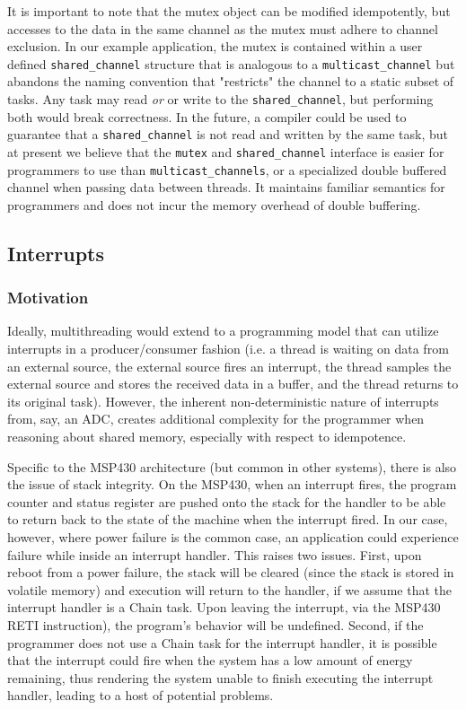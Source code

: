 \documentclass[11pt]{sensys-proc}
\newcommand{\chain}{Chain\xspace}
\begin{document}
It is important to note that the mutex object can be modified idempotently, but
accesses to the data in the same channel as the mutex must adhere to channel
exclusion. In our example application, the mutex is contained within a user
defined \texttt{shared\_channel} structure that is analogous to a
\texttt{multicast\_channel} but abandons the naming convention that "restricts"
the channel to a static subset of tasks. Any task may read {\em or} or write to
the \texttt{shared\_channel}, but performing both would break correctness. In
the future, a compiler could be used to guarantee that a
\texttt{shared\_channel} is not read and written by the same task, but at
present we believe that the \texttt{mutex} and \texttt{shared\_channel}
interface is easier for programmers to use than \texttt{multicast\_channels}, or
a specialized double buffered channel when passing data between threads. It
maintains familiar semantics for programmers and does not incur the memory
overhead of double buffering.


\subsection{Interrupts}
\subsubsection{Motivation}
Ideally, multithreading would extend to a programming model that can utilize
interrupts in a producer/consumer fashion (i.e. a thread is waiting on data
from an external source, the external source fires an interrupt, the thread
samples the external source and stores the received data in a buffer, and
the thread returns to its original task). However, the inherent
non-deterministic
nature of interrupts from, say, an ADC, creates additional complexity for the
programmer when reasoning about shared memory, especially with respect to
idempotence.


    Specific to the MSP430 architecture (but common in other systems), there is
also the issue of stack integrity. On the MSP430, when an interrupt fires,
the program counter and status register are pushed onto the stack for
the handler to be able to return back to the state of the machine when the
interrupt fired. In our case, however, where power failure is the common
case, an application could experience failure while inside an interrupt
handler. This raises two issues. First, upon reboot from a power failure,
the stack will be cleared (since the stack is stored in volatile memory) and
execution will return to the handler, if we assume that the interrupt handler
is a \chain task. Upon leaving the interrupt, via the MSP430 RETI instruction),
the program's behavior will be undefined. Second, if the programmer does not
use a \chain task for the interrupt handler, it is possible that the interrupt
could fire when the system has a low amount of energy remaining, thus
rendering the system unable to finish executing the interrupt handler,
leading to a host of potential problems.
\end{document}
